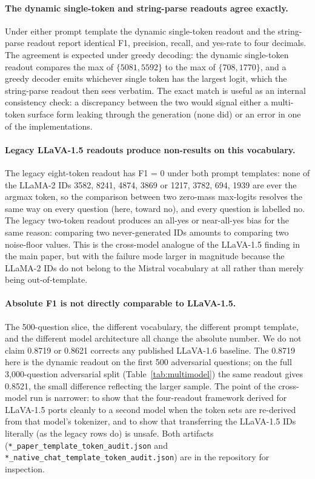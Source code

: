 \documentclass[11pt,letterpaper]{article}
\begin{document}
\paragraph{The dynamic single-token and string-parse readouts agree
exactly.} Under either prompt template the dynamic single-token
readout and the string-parse readout report identical F1, precision,
recall, and yes-rate to four decimals. The agreement is expected
under greedy decoding: the dynamic single-token readout compares the
max of $\{5081, 5592\}$ to the max of $\{708, 1770\}$, and a greedy
decoder emits whichever single token has the largest logit, which the
string-parse readout then sees verbatim. The exact match is useful as
an internal consistency check: a discrepancy between the two would
signal either a multi-token surface form leaking through the
generation (none did) or an error in one of the implementations.

\paragraph{Legacy LLaVA-1.5 readouts produce non-results on this
vocabulary.} The legacy eight-token readout has F1 = 0 under both
prompt templates: none of the LLaMA-2 IDs 3582, 8241, 4874, 3869 or
1217, 3782, 694, 1939 are ever the argmax token, so the comparison
between two zero-mass max-logits resolves the same way on every
question (here, toward no), and every question is labelled no. The
legacy two-token readout produces an all-yes or near-all-yes bias for
the same reason: comparing two never-generated IDs amounts to
comparing two noise-floor values. This is the cross-model analogue
of the LLaVA-1.5 finding in the main paper, but with the failure mode
larger in magnitude because the LLaMA-2 IDs do not belong to the
Mistral vocabulary at all rather than merely being out-of-template.

\paragraph{Absolute F1 is not directly comparable to LLaVA-1.5.} The
500-question slice, the different vocabulary, the different prompt
template, and the different model architecture all change the
absolute number. We do not claim 0.8719 or 0.8621 corrects any
published LLaVA-1.6 baseline. The 0.8719 here is the dynamic readout on
the first 500 adversarial questions; on the full 3{,}000-question
adversarial split (Table~\ref{tab:multimodel}) the same readout gives
0.8521, the small difference reflecting the larger sample. The point of the cross-model run is
narrower: to show that the four-readout framework derived for
LLaVA-1.5 ports cleanly to a second model when the token sets are
re-derived from that model's tokenizer, and to show that transferring
the LLaVA-1.5 IDs literally (as the legacy rows do) is unsafe. Both
artifacts (\texttt{*\_paper\_template\_token\_audit.json} and
\texttt{*\_native\_chat\_template\_token\_audit.json}) are in the
repository for inspection.
\end{document}
